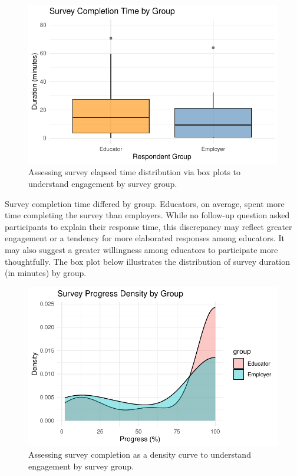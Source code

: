 \documentclass[
  11pt,
  letterpaper,
  DIV=11,
  numbers=noendperiod]{scrartcl}
\numberwithin{figure}{section}
\begin{document}
\begin{figure}[H]

{\centering \includegraphics{Final-Project_files/figure-pdf/Data_Desc_01-1.pdf}

}

\caption{Assessing survey elapsed time distribution via box plots to
understand engagement by survey group.}

\end{figure}

Survey completion time differed by group. Educators, on average, spent
more time completing the survey than employers. While no follow-up
question asked participants to explain their response time, this
discrepancy may reflect greater engagement or a tendency for more
elaborated responses among educators. It may also suggest a greater
willingness among educators to participate more thoughtfully. The box
plot below illustrates the distribution of survey duration (in minutes)
by group.

\begin{figure}[H]

{\centering \includegraphics{Final-Project_files/figure-pdf/Data_Desc_02-1.pdf}

}

\caption{Assessing survey completion as a density curve to understand
engagement by survey group.}

\end{figure}
\end{document}
